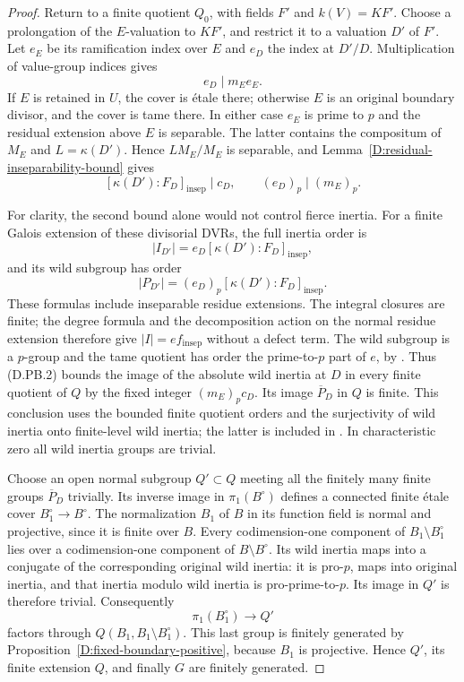 \begin{proof}
Return to a finite quotient $Q_0$, with fields $F'$ and
$k(V)=KF'$.  Choose a prolongation of the $E$-valuation
to $KF'$, and restrict it to a valuation $D'$ of $F'$.
Let $e_E$ be its ramification index over $E$ and $e_D$
the index at $D'/D$.  Multiplication of value-group
indices gives
\[
                         e_D\mid m_Ee_E.
\tag{D.PB.1}
\]
If $E$ is retained in $U$, the cover is \'etale there;
otherwise $E$ is an original boundary divisor, and the
cover is tame there.  In either case $e_E$ is prime to
$p$ and the residual extension above $E$ is separable.
The latter contains the compositum of $M_E$ and
$L=\kappa(D')$.  Hence $LM_E/M_E$ is separable, and
Lemma~\ref{D:residual-inseparability-bound} gives
\[
       [\kappa(D'):F_D]_{\mathrm{insep}}\mid c_D,
       \qquad (e_D)_p\mid (m_E)_p.
\tag{D.PB.2}
\]

For clarity, the second bound alone would not control
fierce inertia.  For a finite Galois extension of these
divisorial DVRs, the full inertia order is
\[
        |I_{D'}|=e_D[\kappa(D'):F_D]_{\mathrm{insep}},
\]
and its wild subgroup has order
\[
        |P_{D'}|=(e_D)_p
                     [\kappa(D'):F_D]_{\mathrm{insep}}.
\]
These formulas include inseparable residue extensions.
The integral closures are finite; the degree formula and
the decomposition action on the normal residue extension
therefore give $|I|=e f_{\mathrm{insep}}$ without a defect
term.  The wild subgroup is a $p$-group and the tame
quotient has order the prime-to-$p$ part of $e$, by
\cite[Lemma 15.114.5, tag 09EE]{C_StacksProjectiveBase}.
Thus (D.PB.2) bounds the image of the absolute wild
inertia at $D$ in every finite quotient of $Q$ by the
fixed integer $(m_E)_p c_D$.  Its image $\overline P_D$
in $Q$ is finite.  This conclusion uses the bounded
finite quotient orders and the surjectivity of wild
inertia onto finite-level wild inertia; the latter is
included in \cite[Lemma 58.13.5, tag 0BUA]
{C_StacksProjectiveBase}.  In characteristic zero all
wild inertia groups are trivial.

Choose an open normal subgroup $Q'\subset Q$ meeting all
the finitely many finite groups $\overline P_D$ trivially.
Its inverse image in $\pi_1(B^\circ)$ defines a connected
finite \'etale cover $B_1^\circ\to B^\circ$.
The normalization $B_1$ of $B$ in its function field is
normal and projective, since it is finite over $B$.
Every codimension-one component of
$B_1\setminus B_1^\circ$ lies over a codimension-one
component of $B\setminus B^\circ$.  Its wild inertia
maps into a conjugate of the corresponding original
wild inertia: it is pro-$p$, maps into original inertia,
and that inertia modulo wild inertia is pro-prime-to-$p$.
Its image in $Q'$ is therefore trivial.  Consequently
\[
       \pi_1(B_1^\circ)\longrightarrow Q'
\]
factors through $Q(B_1,B_1\setminus B_1^\circ)$.
This last group is finitely generated by
Proposition~\ref{D:fixed-boundary-positive}, because
$B_1$ is projective.  Hence $Q'$, its finite extension
$Q$, and finally $G$ are finitely generated.
\end{proof}

